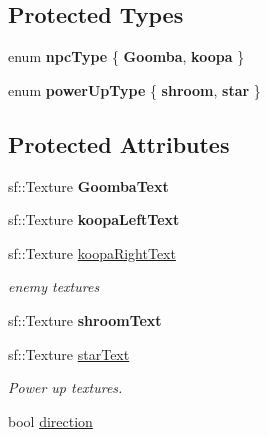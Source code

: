 \subsection*{Protected Types}
\begin{DoxyCompactItemize}
\item 
enum {\bfseries npc\-Type} \{ {\bfseries Goomba}, 
{\bfseries koopa}
 \}
\item 
enum {\bfseries power\-Up\-Type} \{ {\bfseries shroom}, 
{\bfseries star}
 \}
\end{DoxyCompactItemize}
\subsection*{Protected Attributes}
\begin{DoxyCompactItemize}
\item 
\hypertarget{class_npc_ad1ad29ff396ef6164c8ccaecaefa5f5b}{sf\-::\-Texture {\bfseries Goomba\-Text}}\label{class_npc_ad1ad29ff396ef6164c8ccaecaefa5f5b}

\item 
\hypertarget{class_npc_a1eb1469869b587c975379feede8a3fb6}{sf\-::\-Texture {\bfseries koopa\-Left\-Text}}\label{class_npc_a1eb1469869b587c975379feede8a3fb6}

\item 
\hypertarget{class_npc_a1e75f38ac92cba55f14379b97f8f64b4}{sf\-::\-Texture \hyperlink{class_npc_a1e75f38ac92cba55f14379b97f8f64b4}{koopa\-Right\-Text}}\label{class_npc_a1e75f38ac92cba55f14379b97f8f64b4}

\begin{DoxyCompactList}\small\item\em enemy textures \end{DoxyCompactList}\item 
\hypertarget{class_npc_aabe6a589907a40e8955fc79bed1082d9}{sf\-::\-Texture {\bfseries shroom\-Text}}\label{class_npc_aabe6a589907a40e8955fc79bed1082d9}

\item 
\hypertarget{class_npc_a33b0a408e5908f550c30d9802980b0c3}{sf\-::\-Texture \hyperlink{class_npc_a33b0a408e5908f550c30d9802980b0c3}{star\-Text}}\label{class_npc_a33b0a408e5908f550c30d9802980b0c3}

\begin{DoxyCompactList}\small\item\em Power up textures. \end{DoxyCompactList}\item 
\hypertarget{class_npc_aa8b57395241330993689a8839a820b98}{bool \hyperlink{class_npc_aa8b57395241330993689a8839a820b98}{direction}}\label{class_npc_aa8b57395241330993689a8839a820b98}


\end{DoxyCompactItemize}

